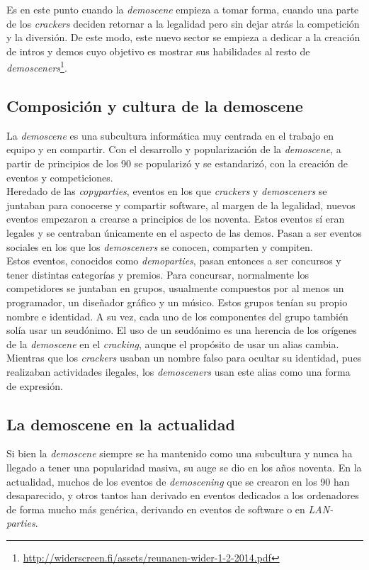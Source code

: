 Es en este punto cuando la \emph{demoscene} empieza a tomar forma, cuando una parte de los \emph{crackers} deciden retornar a la legalidad pero sin dejar atrás la competición y la diversión. De este modo, este nuevo sector se empieza a dedicar a la creación de intros y demos cuyo objetivo es mostrar sus habilidades al resto de \emph{demosceners}\footnote{\url{http://widerscreen.fi/assets/reunanen-wider-1-2-2014.pdf}}.

\subsection{Composición y cultura de la demoscene}

La \emph{demoscene} es una subcultura informática muy centrada en el trabajo en equipo y en compartir. Con el desarrollo y popularización de la \emph{demoscene}, a partir de principios de los 90 se popularizó y se estandarizó, con la creación de eventos y competiciones.\\

Heredado de las \emph{copyparties}, eventos en los que \emph{crackers} y \emph{demosceners} se juntaban para conocerse y compartir software, al margen de la legalidad, nuevos eventos empezaron a crearse a principios de los noventa. Estos eventos sí eran legales y se centraban únicamente en el aspecto de las demos. Pasan a ser eventos sociales en los que los \emph{demosceners} se conocen, comparten y compiten.\\

Estos eventos, conocidos como \emph{demoparties}, pasan entonces a ser concursos y tener distintas categorías y premios. Para concursar, normalmente los competidores se juntaban en grupos, usualmente compuestos por al menos un programador, un diseñador gráfico y un músico. Estos grupos tenían su propio nombre e identidad. A su vez, cada uno de los componentes del grupo también solía usar un seudónimo. El uso de un seudónimo es una herencia de los orígenes de la \emph{demoscene} en el \emph{cracking}, aunque el propósito de usar un alias cambia. Mientras que los \emph{crackers} usaban un nombre falso para ocultar su identidad, pues realizaban actividades ilegales, los \emph{demosceners} usan este alias como una forma de expresión.

\subsection{La demoscene en la actualidad}

Si bien la \emph{demoscene} siempre se ha mantenido como una subcultura y nunca ha llegado a tener una popularidad masiva, su auge se dio en los años noventa.  En la actualidad, muchos de los eventos de \emph{demoscening} que se crearon en los 90 han desaparecido, y otros tantos han derivado en eventos dedicados a los ordenadores de forma mucho más genérica, derivando en eventos de software o en \emph{LAN-parties}.\\

